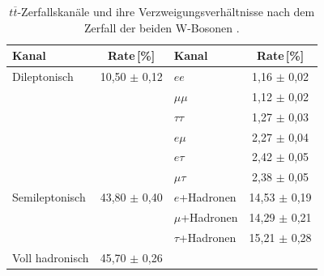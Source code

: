 \begin{table}[ht]
\centering
\begin{tabular}{lc|lc}
Kanal & Rate\,[\%] & Kanal & Rate\,[\%] \\ \hline\hline
Dileptonisch & 10,50 $\pm$ 0,12 & $ee$ & 1,16 $\pm$ 0,02 \\
 &  & $\mu\mu$ & 1,12 $\pm$ 0,02 \\ 
 &  & $\tau\tau$ & 1,27 $\pm$ 0,03 \\
 &  & $e\mu$ & 2,27 $\pm$ 0,04 \\ 
 &  & $e\tau$ & 2,42 $\pm$ 0,05 \\
 &  & $\mu\tau$ & 2,38 $\pm$ 0,05 \\ \hline
Semileptonisch & 43,80 $\pm$ 0,40 & $e$+Hadronen & 14,53 $\pm$ 0,19 \\
 & & $\mu$+Hadronen & 14,29 $\pm$ 0,21 \\
 & & $\tau$+Hadronen & 15,21 $\pm$ 0,28 \\ \hline
Voll hadronisch & 45,70 $\pm$ 0,26 & & \\ \hline
\end{tabular}
	  	\caption{$t\overline{t}$-Zerfallskan\"ale und ihre Verzweigungsverh\"altnisse nach dem Zerfall der beiden W-Bosonen \cite{pdg}.}
	  		\label{TopZerfallsraten}
\end{table}
